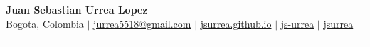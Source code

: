 \begin{center}
  {\fontsize{18pt}{22pt}\selectfont\bfseries Juan Sebastian Urrea Lopez} \\[3pt]
  {\small
  Bogota, Colombia \hspace{4pt}$|$\hspace{4pt}
  \href{mailto:jurrea5518@gmail.com}{jurrea5518@gmail.com} \hspace{4pt}$|$\hspace{4pt}
  \href{https://jsurrea.github.io/}{jsurrea.github.io} \hspace{4pt}$|$\hspace{4pt}
  \href{https://www.linkedin.com/in/js-urrea/}{js-urrea} \hspace{4pt}$|$\hspace{4pt}
  \href{https://github.com/jsurrea}{jsurrea}}
\end{center}
\vspace{-6pt}
\noindent\rule{\linewidth}{0.4pt}
\vspace{-8pt}
